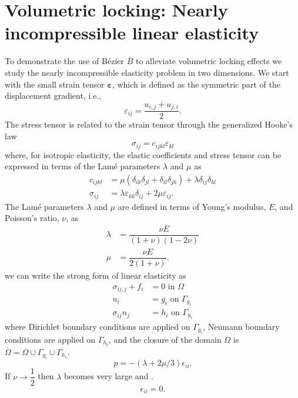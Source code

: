 \documentclass{article}
\newcommand{\Bezier}{{B\'{e}zier} }
\begin{document}
\section{Volumetric locking: Nearly incompressible linear elasticity}
\label{sec:nearlyincompressible}
To demonstrate the use of \Bezier $\bar{B}$  to alleviate volumetric locking effects we study the nearly incompressible elasticity problem in two dimensions. We start with the small strain tensor $\boldsymbol{\varepsilon}$, which is defined as the symmetric part of the displacement gradient, i.e., 
\begin{equation}
\varepsilon_{ij}=\dfrac{u_{i,j}+u_{j,i}}{2}.
\end{equation}
The stress tensor is related to the strain tensor through the generalized Hooke's law
\begin{equation}
\sigma_{ij}=c_{ijkl}\varepsilon_{kl}
\end{equation}
where, for isotropic elasticity, the elastic coefficients and stress tensor can be expressed in terms of the Lam\'{e} parameters $\lambda$ and $\mu$ as
\begin{align}
c_{ijkl} &=\mu(\delta_{ik}\delta_{jl}+\delta_{il}\delta_{jk})+\lambda\delta_{ij}\delta_{kl}\\
\sigma_{ij} &= \lambda\varepsilon_{kk}\delta_{ij} + 2\mu\varepsilon_{ij}.
\end{align}
The Lam\'e parameters $\lambda$ and $\mu$ are defined in terms of Young's modulus, $E$, and Poisson's ratio, $\nu$, as
\begin{align}
\lambda &=\dfrac{\nu{E}}{(1+\nu)(1-2\nu)}\\
\mu &=\dfrac{\nu{E}}{2(1+\nu)}.
\end{align}
we can write the strong form of linear elasticity as
\begin{align}
	\sigma_{ij,j}+f_i &= 0 \text{ in $\Omega$} \\
    u_i &= g_i\text{ on $\Gamma_{g_i}$} \\
    \sigma_{ij}n_j &= h_i\text{ on $\Gamma_{h_i}$}
\end{align}
where Dirichlet boundary conditions are applied on $\Gamma_{g_i}$, Neumann boundary conditions are applied on $\Gamma_{h_i}$, and the closure of the domain $\Omega$ is $\bar{\Omega}=\Omega\cup\Gamma_{g_i}\cup\Gamma_{h_i}$. 
\begin{equation}
    p=-(\lambda+2\mu/3){\epsilon}_{ii}.
\end{equation}
If $\nu\rightarrow\dfrac{1}{2}$ then $\lambda$ becomes very large and .
\begin{equation}
    {\epsilon}_{ii}=0.
\end{equation}
\end{document}
